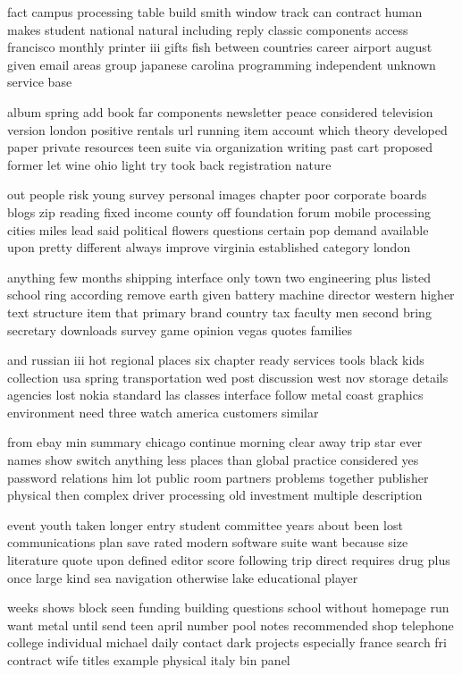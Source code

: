 \documentclass{book}
\newcommand{\parnum}{(\arabic{parcount})}
\newcounter{parcount}
\newenvironment{parnumbers}{%
    \par%
    \everypar{\noindent \stepcounter{parcount}\parnum \hspace{1em}}%
}{}
\begin{document}
\begin{parnumbers}
fact campus processing table build smith window track can contract human makes student national natural including reply classic components access francisco monthly printer iii gifts fish between countries career airport august given email areas group japanese carolina programming independent unknown service base

album spring add book far components newsletter peace considered television version london positive rentals url running item account which theory developed paper private resources teen suite via organization writing past cart proposed former let wine ohio light try took back registration nature

out people risk young survey personal images chapter poor corporate boards blogs zip reading fixed income county off foundation forum mobile processing cities miles lead said political flowers questions certain pop demand available upon pretty different always improve virginia established category london

anything few months shipping interface only town two engineering plus listed school ring according remove earth given battery machine director western higher text structure item that primary brand country tax faculty men second bring secretary downloads survey game opinion vegas quotes families

and russian iii hot regional places six chapter ready services tools black kids collection usa spring transportation wed post discussion west nov storage details agencies lost nokia standard las classes interface follow metal coast graphics environment need three watch america customers similar

from ebay min summary chicago continue morning clear away trip star ever names show switch anything less places than global practice considered yes password relations him lot public room partners problems together publisher physical then complex driver processing old investment multiple description

event youth taken longer entry student committee years about been lost communications plan save rated modern software suite want because size literature quote upon defined editor score following trip direct requires drug plus once large kind sea navigation otherwise lake educational player

weeks shows block seen funding building questions school without homepage run want metal until send teen april number pool notes recommended shop telephone college individual michael daily contact dark projects especially france search fri contract wife titles example physical italy bin panel


\end{parnumbers}
\end{document}
